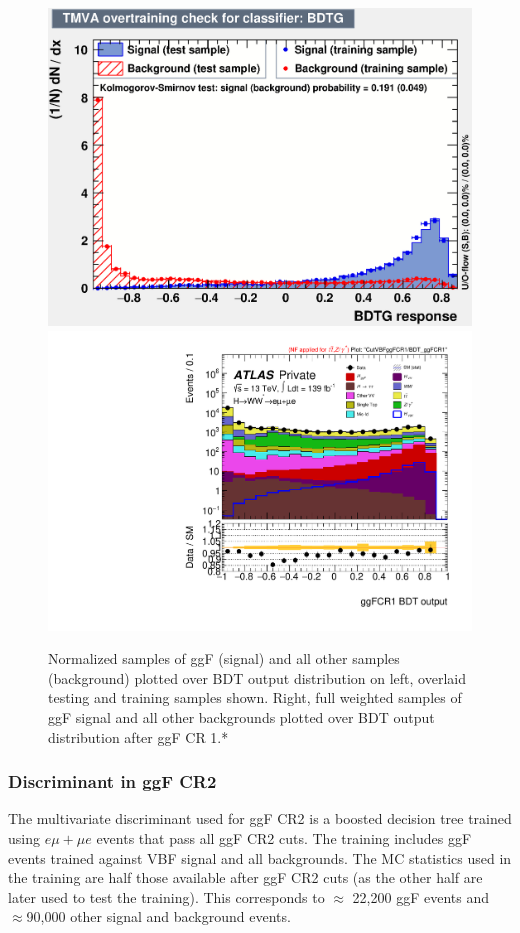 \begin{figure}[!htbp]
\centering
  \includegraphics[width=.4\linewidth]{Pictures/ggFCR1/overtrain_BDTG.eps}
  \includegraphics[width=.45\linewidth]{Pictures/run2-emme-CutVBFggFCR1-BDT_ggFCR1-log.pdf}
\caption{Normalized samples of ggF (signal) and all other samples (background) plotted over BDT output distribution on left, overlaid testing and training samples shown. Right, full weighted samples of ggF signal and all other backgrounds plotted over BDT output distribution after ggF CR 1.*}
\label{fig:ggFCR1BDTresult}
\end{figure}

\subsubsection{Discriminant in ggF CR2}

The multivariate discriminant used for ggF CR2 is a boosted decision tree trained using $e\mu+\mu e$ events that pass all ggF CR2 cuts. The training includes ggF events trained against VBF signal and all backgrounds. The MC statistics used in the training are half those available after ggF CR2 cuts (as the other half are later used to test the training). This corresponds to $\approx$ 22,200 ggF events and $\approx$90,000 other signal and background events.

